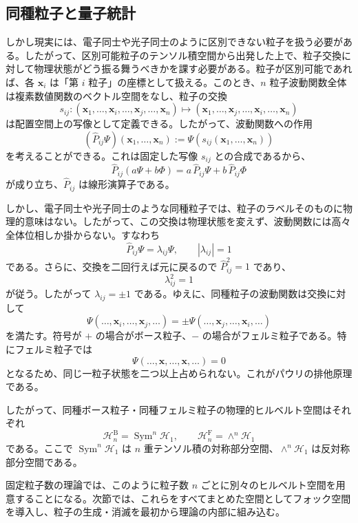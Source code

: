 \subsection{同種粒子と量子統計}
しかし現実には、電子同士や光子同士のように区別できない粒子を扱う必要がある。したがって、区別可能粒子のテンソル積空間から出発した上で、粒子交換に対して物理状態がどう振る舞うべきかを課す必要がある。粒子が区別可能であれば、各 $\mathbf{x}_i$ は「第 $i$ 粒子」の座標として扱える。このとき、$n$ 粒子波動関数全体は複素数値関数のベクトル空間をなし、粒子の交換
\[
s_{ij} : (\mathbf{x}_1,\dots,\mathbf{x}_i,\dots,\mathbf{x}_j,\dots,\mathbf{x}_n)
\mapsto
(\mathbf{x}_1,\dots,\mathbf{x}_j,\dots,\mathbf{x}_i,\dots,\mathbf{x}_n)
\]
は配置空間上の写像として定義できる。したがって、波動関数への作用
\[
(\hat{P}_{ij}\Psi)(\mathbf{x}_1,\dots,\mathbf{x}_n)
:=
\Psi(s_{ij}(\mathbf{x}_1,\dots,\mathbf{x}_n))
\]
を考えることができる。これは固定した写像 $s_{ij}$ との合成であるから、
\[
\hat{P}_{ij}(a\Psi+b\Phi)
=
a\,\hat{P}_{ij}\Psi+b\,\hat{P}_{ij}\Phi
\]
が成り立ち、$\hat{P}_{ij}$ は線形演算子である。

しかし、電子同士や光子同士のような同種粒子では、粒子のラベルそのものに物理的意味はない。したがって、この交換は物理状態を変えず、波動関数には高々全体位相しか掛からない。すなわち
\[
\hat{P}_{ij}\Psi = \lambda_{ij}\Psi,
\qquad |\lambda_{ij}|=1
\]
である。さらに、交換を二回行えば元に戻るので $\hat{P}_{ij}^2=1$ であり、
\[
\lambda_{ij}^2=1
\]
が従う。したがって $\lambda_{ij}=\pm 1$ である。ゆえに、同種粒子の波動関数は交換に対して
\[
\Psi(\dots,\mathbf{x}_i,\dots,\mathbf{x}_j,\dots)
= \pm
\Psi(\dots,\mathbf{x}_j,\dots,\mathbf{x}_i,\dots)
\]
を満たす。符号が $+$ の場合がボース粒子、$-$ の場合がフェルミ粒子である。特にフェルミ粒子では
\[
\Psi(\dots,\mathbf{x},\dots,\mathbf{x},\dots)=0
\]
となるため、同じ一粒子状態を二つ以上占められない。これがパウリの排他原理である。

したがって、同種ボース粒子・同種フェルミ粒子の物理的ヒルベルト空間はそれぞれ
\[
\mathcal{H}_n^{\mathrm{B}} = \operatorname{Sym}^n \mathcal{H}_1,
\qquad
\mathcal{H}_n^{\mathrm{F}} = \wedge^n \mathcal{H}_1
\]
である。ここで $\operatorname{Sym}^n \mathcal{H}_1$ は $n$ 重テンソル積の対称部分空間、$\wedge^n \mathcal{H}_1$ は反対称部分空間である。

固定粒子数の理論では、このように粒子数 $n$ ごとに別々のヒルベルト空間を用意することになる。次節では、これらをすべてまとめた空間としてフォック空間を導入し、粒子の生成・消滅を最初から理論の内部に組み込む。
